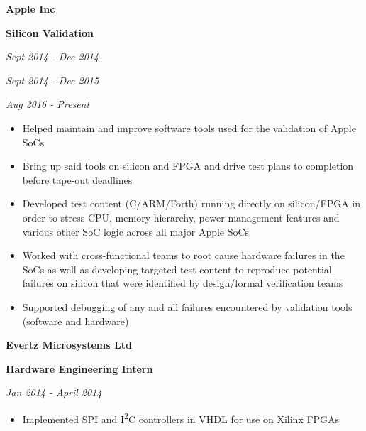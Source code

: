 \documentclass{article}
\newenvironment{name}{\fontfamily{phv}\selectfont\bfseries\normalsize}{\par}
\newenvironment{colorheading}{\fontfamily{phv}\selectfont\bfseries\normalsize\color{darkcyan}}{\par}
\newenvironment{metadata}{\fontfamily{phv}\selectfont\itshape\small\color{darkgray}}{\par}
\newenvironment{itemizedbody}{\fontfamily{phv}\selectfont\small\begin{itemize}}{\end{itemize}\par}
\newenvironment{experience}[2]%
{%
  \begin{minipage}{0.6\linewidth}\begin{flushleft}#1\end{flushleft}\end{minipage}%
  \hfill%
  \begin{minipage}{0.3\linewidth}\begin{flushright}#2\end{flushright}\end{minipage}%
}%
{}
\newcommand{\lineitem}{\item[{$\to$}]}
\begin{document}
  \begin{minipage}[t]{0.6\linewidth}
    \begin{experience}
    {
      \begin{name}Apple Inc\end{name}
      \begin{colorheading}Silicon Validation\end{colorheading}
    }
    {
      \begin{metadata}Sept 2014 - Dec 2014\end{metadata}
      \begin{metadata}Sept 2014 - Dec 2015\end{metadata}
      \begin{metadata}Aug 2016 - Present\end{metadata}
    }
    \end{experience}
    \begin{itemizedbody}
      \lineitem Helped maintain and improve software tools used for the validation of Apple SoCs
      \lineitem Bring up said tools on silicon and FPGA and drive test plans to completion before tape-out deadlines
      \lineitem Developed test content (C/ARM/Forth) running directly on silicon/FPGA in order to stress CPU,
                memory hierarchy, power management features and various other SoC logic across all major Apple SoCs
      \lineitem Worked with cross-functional teams to root cause hardware failures in the SoCs as well as developing
                targeted test content to reproduce potential failures on silicon that were identified by design/formal
                verification teams
      \lineitem Supported debugging of any and all failures encountered by validation tools (software and hardware)
    \end{itemizedbody}
    \smallskip
    \begin{experience}
    {
      \begin{name}Evertz Microsystems Ltd\end{name}
      \begin{colorheading}Hardware Engineering Intern\end{colorheading}
    }
    {
      \begin{metadata}Jan 2014 - April 2014\end{metadata}
    }
    \end{experience}
    \begin{itemizedbody}
      \lineitem Implemented SPI and I\textsuperscript{2}C controllers in VHDL for use on Xilinx FPGAs

\end{itemizedbody}
\end{minipage}
\end{document}
